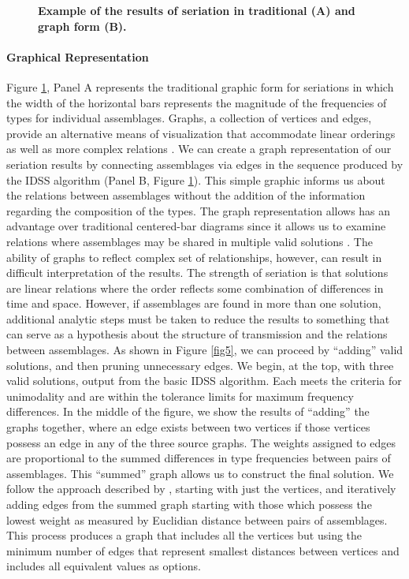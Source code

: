 \documentclass[10pt,letterpaper]{article}
\begin{document}
\begin{figure}[h]
\caption{{\bf Example of the results of seriation in traditional (A) and graph form (B).}}
\label{fig4}
\end{figure}


\paragraph{Graphical Representation}

Figure \ref{fig4}, Panel A represents the traditional graphic form for seriations in which the width of the horizontal bars represents the magnitude of the frequencies of types for individual assemblages. Graphs, a collection of vertices and edges, provide an alternative means of visualization that accommodate linear orderings as well as more complex relations \cite{Diestel2010,Flament1963,Harary1969,Lipo2005,Wasserman1994}. We can create a graph representation of our seriation results by connecting assemblages via edges in the sequence produced by the IDSS algorithm (Panel B, Figure \ref{fig4}). This simple graphic informs us about the relations between assemblages without the addition of the information regarding the composition of the types. The graph representation allows has an advantage over traditional centered-bar diagrams since it allows us to examine relations where assemblages may be shared in multiple valid solutions \cite{Cochrane2010,Lipo2005}.    
The ability of graphs to reflect complex set of relationships, however, can result in difficult interpretation of the results. The strength of seriation is that solutions are linear relations where the order reflects some combination of differences in time and space. However, if assemblages are found in more than one solution, additional analytic steps must be taken to reduce the results to something that can serve as a hypothesis about the structure of transmission and the relations between assemblages. As shown in Figure \ref{fig5}, we can proceed by “adding” valid solutions, and then pruning unnecessary edges.  We begin, at the top, with three valid solutions, output from the basic IDSS algorithm.  Each meets the criteria for unimodality and are within the tolerance limits for maximum frequency differences.  In the middle of the figure, we show the results of “adding” the graphs together, where an edge exists between two vertices if those vertices possess an edge in any of the three source graphs.  The weights assigned to edges are proportional to the summed differences in type frequencies between pairs of assemblages.  This “summed” graph allows us to construct the final solution. We follow the approach described by \cite{Lipo2005}, starting with just the vertices, and iteratively adding edges from the summed graph starting with those which possess the lowest weight as measured by Euclidian distance between pairs of assemblages. This process produces a graph that includes all the vertices but using the minimum number of edges that represent smallest distances between vertices and includes all equivalent values as options.
\end{document}
